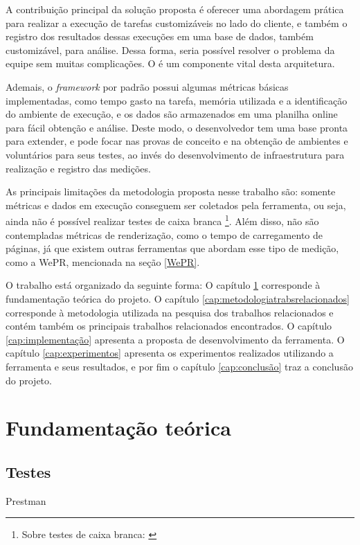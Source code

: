 \documentclass[12pt]{tcc}
\begin{document}
A contribuição principal da solução proposta é oferecer uma abordagem prática para realizar a execução de tarefas customizáveis no lado do cliente, e também o registro dos resultados dessas execuções em uma base de dados, também customizável, para análise. Dessa forma, seria possível resolver o problema da equipe sem muitas complicações. O  é um componente vital desta arquitetura.

Ademais, o \emph{framework} por padrão possui algumas métricas básicas implementadas, como tempo gasto na tarefa, memória utilizada e a identificação do ambiente de execução, e os dados são armazenados em uma planilha online para fácil obtenção e análise. Deste modo, o desenvolvedor tem uma base pronta para extender, e pode focar nas provas de conceito e na obtenção de ambientes e voluntários para seus testes, ao invés do desenvolvimento de infraestrutura para realização e registro das medições.

As principais limitações da metodologia proposta nesse trabalho são: somente métricas e dados em execução conseguem ser coletados pela ferramenta, ou seja, ainda não é possível realizar testes de caixa branca \footnote{Sobre testes de caixa branca: \citep[Capítulo 21]{Sommerville2015Software}}. Além disso, não são contempladas métricas de renderização, como o tempo de carregamento de páginas, já que existem outras ferramentas que abordam esse tipo de medição, como a WePR, mencionada na seção \ref{WePR}.

O trabalho está organizado da seguinte forma: O capítulo \ref{cap:fundamentacao_teorica} corresponde à fundamentação teórica do projeto. O capítulo \ref{cap:metodologiatrabsrelacionados} corresponde à metodologia utilizada na pesquisa dos trabalhos relacionados e contém também os principais trabalhos relacionados encontrados.
O capítulo \ref{cap:implementação} apresenta a proposta de desenvolvimento da ferramenta. O capítulo \ref{cap:experimentos} apresenta os experimentos realizados utilizando a ferramenta e seus resultados, e por fim o capítulo \ref{cap:conclusão} traz a conclusão do projeto.


\chapter{Fundamentação teórica}
\label{cap:fundamentacao_teorica}

	\section{Testes}
	\label{cap:solid}
	Prestman
\end{document}
